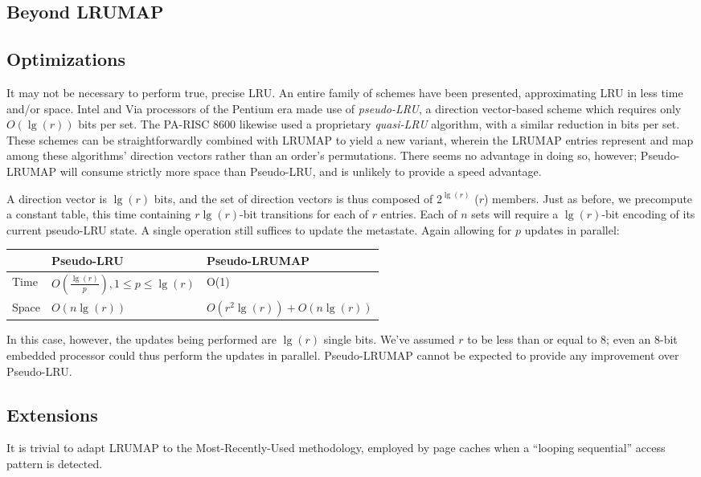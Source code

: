 \documentclass[letterpaper,10pt]{article}
\begin{document}
\begin{multicols}{2}
\section{Beyond LRUMAP}
\subsection{Optimizations}
It may not be necessary to perform true, precise LRU. An entire family of
schemes have been presented, approximating LRU in less time and/or space.
Intel\cite{shanley} and Via processors of the Pentium era made use of
\textit{pseudo-LRU}, a direction vector-based scheme which requires only
$O(\lg{(r)})$ bits per set\cite{handy}. The PA-RISC 8600\cite{hurd} likewise used
a proprietary \textit{quasi-LRU} algorithm, with a similar reduction in bits
per set. These schemes can be straightforwardly combined with LRUMAP to yield a
new variant, wherein the LRUMAP entries represent and map among these
algorithms' direction vectors rather than an order's permutations. There seems
no advantage in doing so, however; Pseudo-LRUMAP will consume strictly more space
than Pseudo-LRU, and is unlikely to provide a speed advantage.

A direction vector is $\lg{(r)}$ bits, and the set of direction vectors is thus
composed of $2^{\lg{(r)}}$ ($r$) members. Just as before, we precompute a constant
table, this time containing $r \lg{(r)}$-bit transitions for each of $r$
entries. Each of $n$ sets will require a $\lg{(r)}$-bit encoding of its current
pseudo-LRU state. A single operation still suffices to update the metastate.
Again allowing for $p$ updates in parallel:
\begin{center}
\begin{tabular}{|l|l|l|}
\hline
 & Pseudo-LRU & Pseudo-LRUMAP \\
\hline
Time & $O(\frac{\lg{(r)}}{p}), 1\le{p}\le{\lg{(r)}}$ & O(1) \\
\hline
Space & $O(n\lg{(r)})$ & $O(r^{2}\lg{(r)}) + O(n\lg{(r)})$ \\
\hline
\end{tabular}
\end{center}
In this case, however, the updates being performed are $\lg{(r)}$ single bits.
We've assumed $r$ to be less than or equal to 8; even an 8-bit embedded processor
could thus perform the updates in parallel. Pseudo-LRUMAP cannot be expected to
provide any improvement over Pseudo-LRU.
\subsection{Extensions}
It is trivial to adapt LRUMAP to the Most-Recently-Used methodology, employed
by page caches when a ``looping sequential''\cite{dewitt} access pattern is
detected.


\end{multicols}
\end{document}
